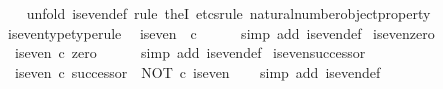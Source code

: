 \begin{isabellebody}
%
\isadelimproof
\ \ %
\endisadelimproof
%
\isatagproof
{}\isamarkupfalse%
\ {\isacharparenleft}{\kern0pt}unfold\ is{\isacharunderscore}{\kern0pt}even{\isacharunderscore}{\kern0pt}def{\isacharcomma}{\kern0pt}\ rule\ theI{\isacharprime}{\kern0pt}{\isacharcomma}{\kern0pt}\ etcs{\isacharunderscore}{\kern0pt}rule\ natural{\isacharunderscore}{\kern0pt}number{\isacharunderscore}{\kern0pt}object{\isacharunderscore}{\kern0pt}property{}{\isacharparenright}{\kern0pt}%
\endisatagproof
{\isafoldproof}%
%
\isadelimproof
\isanewline
%
\endisadelimproof
\isanewline
{}\isamarkupfalse%
\ is{\isacharunderscore}{\kern0pt}even{\isacharunderscore}{\kern0pt}type{\isacharbrackleft}{\kern0pt}type{\isacharunderscore}{\kern0pt}rule{\isacharbrackright}{\kern0pt}{\isacharcolon}{\kern0pt}\isanewline
\ \ {\isachardoublequoteopen}is{\isacharunderscore}{\kern0pt}even\ {\isacharcolon}{\kern0pt}\ {\isasymnat}\isactrlsub c\ {\isasymrightarrow}\ {\isasymOmega}{\isachardoublequoteclose}\isanewline
%
\isadelimproof
\ \ %
\endisadelimproof
%
\isatagproof
{}\isamarkupfalse%
\ {\isacharparenleft}{\kern0pt}simp\ add{\isacharcolon}{\kern0pt}\ is{\isacharunderscore}{\kern0pt}even{\isacharunderscore}{\kern0pt}def{}{\isacharparenright}{\kern0pt}%
\endisatagproof
{\isafoldproof}%
%
\isadelimproof
\isanewline
%
\endisadelimproof
\isanewline
{}\isamarkupfalse%
\ is{\isacharunderscore}{\kern0pt}even{\isacharunderscore}{\kern0pt}zero{\isacharcolon}{\kern0pt}\isanewline
\ \ {\isachardoublequoteopen}is{\isacharunderscore}{\kern0pt}even\ {\isasymcirc}\isactrlsub c\ zero\ {\isacharequal}{\kern0pt}\ {\isasymt}{\isachardoublequoteclose}\isanewline
%
\isadelimproof
\ \ %
\endisadelimproof
%
\isatagproof
{}\isamarkupfalse%
\ {\isacharparenleft}{\kern0pt}simp\ add{\isacharcolon}{\kern0pt}\ is{\isacharunderscore}{\kern0pt}even{\isacharunderscore}{\kern0pt}def{}{\isacharparenright}{\kern0pt}%
\endisatagproof
{\isafoldproof}%
%
\isadelimproof
\isanewline
%
\endisadelimproof
\isanewline
{}\isamarkupfalse%
\ is{\isacharunderscore}{\kern0pt}even{\isacharunderscore}{\kern0pt}successor{\isacharcolon}{\kern0pt}\isanewline
\ \ {\isachardoublequoteopen}is{\isacharunderscore}{\kern0pt}even\ {\isasymcirc}\isactrlsub c\ successor\ {\isacharequal}{\kern0pt}\ NOT\ {\isasymcirc}\isactrlsub c\ is{\isacharunderscore}{\kern0pt}even{\isachardoublequoteclose}\isanewline
%
\isadelimproof
\ \ %
\endisadelimproof
%
\isatagproof
{}\isamarkupfalse%
\ {\isacharparenleft}{\kern0pt}simp\ add{\isacharcolon}{\kern0pt}\ is{\isacharunderscore}{\kern0pt}even{\isacharunderscore}{\kern0pt}def{}{\isacharparenright}{\kern0pt}%

\end{isabellebody}

